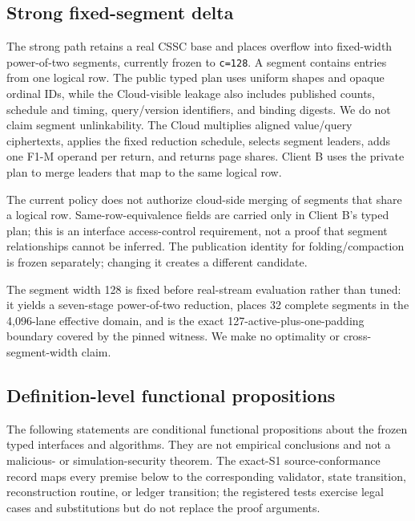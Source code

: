 \subsection{Strong fixed-segment delta}\label{strong-fixed-segment-delta}

The strong path retains a real CSSC base and places overflow into fixed-width power-of-two segments, currently frozen to \texttt{c=128}. A segment contains entries from one logical row. The public typed plan uses uniform shapes and opaque ordinal IDs, while the Cloud-visible leakage also includes published counts, schedule and timing, query/version identifiers, and binding digests. We do not claim segment unlinkability. The Cloud multiplies aligned value/query ciphertexts, applies the fixed reduction schedule, selects segment leaders, adds one F1-M operand per return, and returns page shares. Client B uses the private plan to merge leaders that map to the same logical row.

The current policy does not authorize cloud-side merging of segments that share a logical row. Same-row-equivalence fields are carried only in Client B's typed plan; this is an interface access-control requirement, not a proof that segment relationships cannot be inferred. The publication identity for folding/compaction is frozen separately; changing it creates a different candidate.

The segment width 128 is fixed before real-stream evaluation rather than tuned: it yields a seven-stage power-of-two reduction, places 32 complete segments in the 4,096-lane effective domain, and is the exact 127-active-plus-one-padding boundary covered by the pinned witness. We make no optimality or cross-segment-width claim.

\subsection{Definition-level functional propositions}\label{definition-level-functional-propositions}

The following statements are conditional functional propositions about the frozen typed interfaces and algorithms. They are not empirical conclusions and not a malicious- or simulation-security theorem. The exact-S1 source-conformance record maps every premise below to the corresponding validator, state transition, reconstruction routine, or ledger transition; the registered tests exercise legal cases and substitutions but do not replace the proof arguments.

